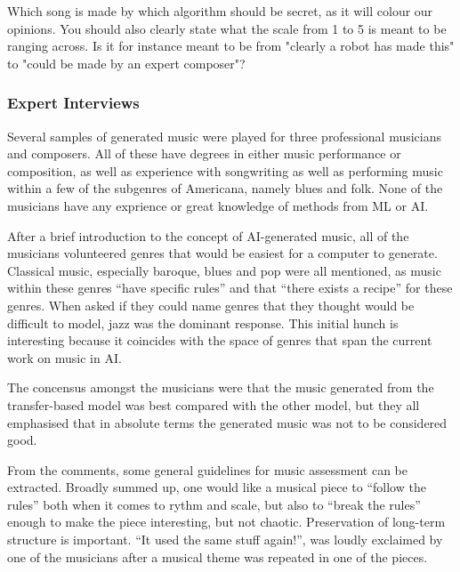 \documentclass{IEEEtran}
\begin{document}
\begin{displayquote}
Which song is made by which algorithm should be secret, as it will colour our
opinions. You should also clearly state what the scale from 1 to 5 is meant
to be ranging across. Is it for instance meant to be from "clearly a robot
has made this" to "could be made by an expert composer"?   
\end{displayquote}


\subsubsection{Expert Interviews}

Several samples of generated music were played for three
professional musicians and composers. All of these have degrees in
either music performance or composition, as well as experience with 
songwriting as well as performing music within a few of the subgenres of 
Americana, namely blues and folk. None of the musicians have any 
exprience or great knowledge of methods from ML or AI.

After a brief introduction to the concept of AI-generated music,
all of the musicians 
volunteered genres that would be easiest for a computer to generate. 
Classical music, especially baroque, blues and pop were all mentioned, 
as music within these genres ``have specific rules'' and that 
``there exists a recipe'' for these genres.
When asked if they could name genres that 
they thought would be difficult to model, jazz was the dominant response.
This initial hunch is interesting because 
it coincides with the space of genres that span the current work on music 
in AI.

The concensus amongst the musicians were that the music generated from 
the transfer-based model was best compared with the other model, but they
all emphasised that in absolute terms the generated music was not to be 
considered good.

From the comments, some general guidelines for music assessment can be 
extracted. Broadly summed up, one would like a musical piece to
``follow the rules'' both when it comes to rythm and scale, but also to 
``break the rules'' enough to make the piece interesting, but not 
chaotic. Preservation of long-term structure is important.
``It used the same stuff again!'', was loudly exclaimed 
by one of the musicians after a musical theme was repeated in one of the 
pieces.
\end{document}
